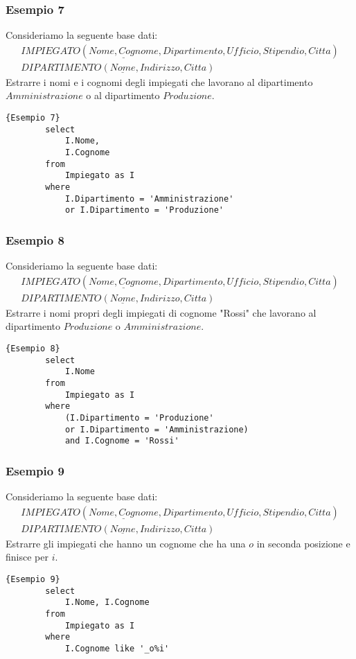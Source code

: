 \subsubsection{Esempio 7}
Consideriamo la seguente base dati:
    \begin{equation}\begin{aligned}
        IMPIEGATO (\underline{Nome, Cognome}, Dipartimento, Ufficio, Stipendio, Citta)\\
        DIPARTIMENTO (\underline{Nome}, Indirizzo, Citta)
    \end{aligned}\end{equation}
Estrarre i nomi e i cognomi degli impiegati che lavorano al dipartimento $Amministrazione$ o al dipartimento $Produzione$.
    \begin{lstlisting}{Esempio 7}
        select 
            I.Nome,
            I.Cognome
        from 
            Impiegato as I
        where 
            I.Dipartimento = 'Amministrazione'
            or I.Dipartimento = 'Produzione'
    \end{lstlisting}
    
\subsubsection{Esempio 8}
Consideriamo la seguente base dati:
    \begin{equation}\begin{aligned}
        IMPIEGATO (\underline{Nome, Cognome}, Dipartimento, Ufficio, Stipendio, Citta)\\
        DIPARTIMENTO (\underline{Nome}, Indirizzo, Citta)
    \end{aligned}\end{equation}
Estrarre i nomi propri degli impiegati di cognome "Rossi" che lavorano al dipartimento $Produzione$ o $Amministrazione$.
    \begin{lstlisting}{Esempio 8}
        select 
            I.Nome
        from 
            Impiegato as I
        where 
            (I.Dipartimento = 'Produzione'
            or I.Dipartimento = 'Amministrazione)
            and I.Cognome = 'Rossi'
    \end{lstlisting}
    
\subsubsection{Esempio 9}
Consideriamo la seguente base dati:
    \begin{equation}\begin{aligned}
        IMPIEGATO (\underline{Nome, Cognome}, Dipartimento, Ufficio, Stipendio, Citta)\\
        DIPARTIMENTO (\underline{Nome}, Indirizzo, Citta)
    \end{aligned}\end{equation}
Estrarre gli impiegati che hanno un cognome che ha una $o$ in seconda posizione e finisce per $i$.
    \begin{lstlisting}{Esempio 9}
        select 
            I.Nome, I.Cognome
        from 
            Impiegato as I
        where 
            I.Cognome like '_o%i'
    \end{lstlisting}



